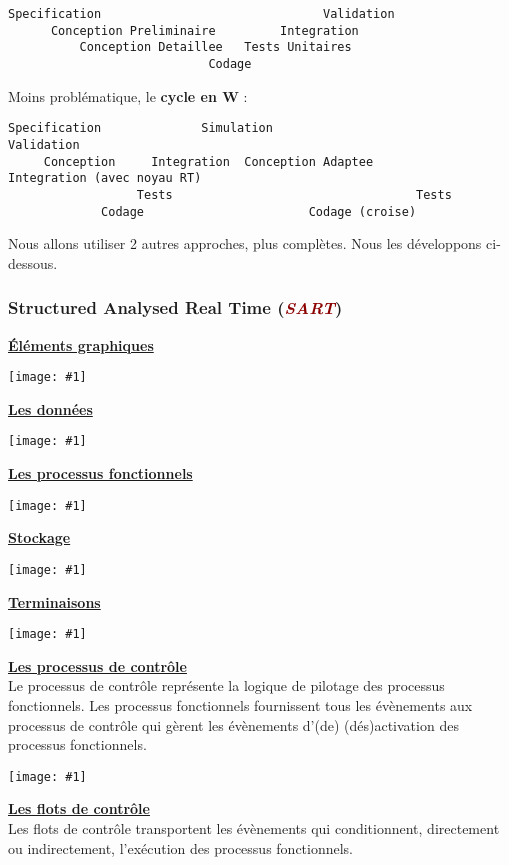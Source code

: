 \documentclass{article}
\newcommand{\red}[1]{\textcolor{darkred}{#1}}
\newcommand{\imgR}[2]{\begin{center}\texttt{[image: \#1]}\end{center}}
\newcommand{\stitre}[1]{\noindent\textbf{\underline{#1}} \\}
\begin{document}
\begin{lstlisting}
Specification                               Validation
      Conception Preliminaire         Integration
          Conception Detaillee   Tests Unitaires
                            Codage
\end{lstlisting}

Moins problématique, le \textbf{cycle en W} :

\begin{lstlisting}
Specification              Simulation                            Validation
     Conception     Integration  Conception Adaptee         Integration (avec noyau RT)
                  Tests                                  Tests
             Codage                       Codage (croise)
\end{lstlisting}

Nous allons utiliser 2 autres approches, plus complètes. Nous les développons ci-dessous.

\subsubsection{Structured Analysed Real Time (\textit{\red{SART}})}

\stitre{\'{E}léments graphiques}

\imgR{img/ITR_001.png}{400}

\stitre{Les données}

\imgR{img/ITR_002.png}{400}

\stitre{Les processus fonctionnels}

\imgR{img/ITR_003.png}{150}

\stitre{Stockage}

\imgR{img/ITR_004.png}{400}

\stitre{Terminaisons}

\imgR{img/ITR_005.png}{300}

\stitre{Les processus de contrôle}

Le processus de contrôle représente la logique de pilotage des processus fonctionnels. Les processus fonctionnels 
fournissent tous les évènements aux processus de contrôle qui gèrent les évènements d'(de) (dés)activation des
processus fonctionnels.

\imgR{img/ITR_006.png}{75}

\stitre{Les flots de contrôle}

Les flots de contrôle transportent les évènements qui conditionnent, directement ou indirectement, l’exécution 
des processus fonctionnels.
\end{document}
